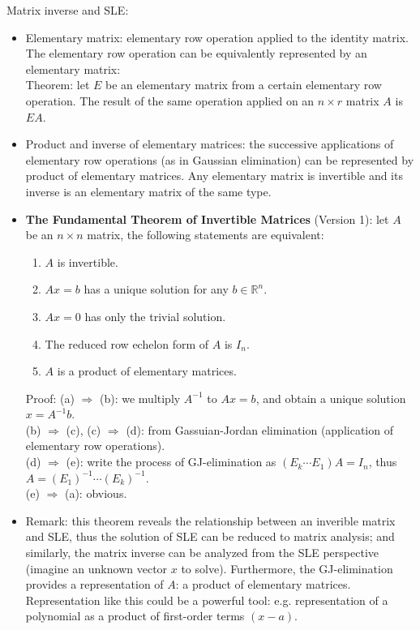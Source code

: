 \documentclass{report}
\begin{document}
Matrix inverse and SLE: 
\begin{itemize}
\item Elementary matrix: elementary row operation applied to the identity matrix. The elementary row operation can be equivalently represented by an elementary matrix: \\
Theorem: let $E$ be an elementary matrix from a certain elementary row operation. The result of the same operation applied on an $n \times r$ matrix $A$ is $EA$. 

\item Product and inverse of elementary matrices: the successive applications of elementary row operations (as in Gaussian elimination) can be represented by product of elementary matrices. Any elementary matrix is invertible and its inverse is an elementary matrix of the same type. 

\item \textbf{The Fundamental Theorem of Invertible Matrices} (Version 1): let $A$ be an $n \times n$ matrix, the following statements are equivalent: 
\begin{enumerate}
\item $A$ is invertible. 
\item $Ax = b$ has a unique solution for any $b \in \mathbb{R}^n$. 
\item $Ax = 0$ has only the trivial solution. 
\item The reduced row echelon form of $A$ is $I_n$. 
\item $A$ is a product of elementary matrices. 
\end{enumerate}
Proof: (a) $\Rightarrow$ (b): we multiply $A^{-1}$ to $A x = b$, and obtain a unique solution $x = A^{-1} b$. \\
(b) $\Rightarrow$ (c), (c) $\Rightarrow$ (d): from Gassuian-Jordan elimination (application of elementary row operations). \\
(d) $\Rightarrow$ (e): write the process of GJ-elimination as $(E_k \cdots E_1) A = I_n$, thus $A = (E_1)^{-1} \cdots (E_k)^{-1}$.\\
(e) $\Rightarrow$ (a): obvious.

\item Remark: this theorem reveals the relationship between an inverible matrix and SLE, thus the solution of SLE can be reduced to matrix analysis; and similarly, the matrix inverse can be analyzed from the SLE perspective (imagine an unknown vector $x$ to solve). Furthermore, the GJ-elimination provides a representation of $A$: a product of elementary matrices. Representation like this could be a powerful tool: e.g. representation of a polynomial as a product of first-order terms $(x-a)$. 


\end{itemize}
\end{document}
